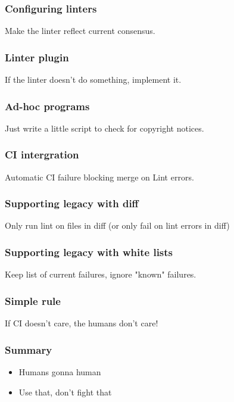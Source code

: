 \begin{frame}
\frametitle{Configuring linters}
Make the linter reflect current consensus.
\end{frame}

\begin{frame}
\frametitle{Linter plugin}
If the linter doesn't do something,
implement it.
\end{frame}

\begin{frame}
\frametitle{Ad-hoc programs}
Just write a little script to check for copyright notices.
\end{frame}

\begin{frame}
\frametitle{CI intergration}
Automatic CI failure blocking merge on Lint errors.
\end{frame}

\begin{frame}
\frametitle{Supporting legacy with diff}
Only run lint on files in diff
(or only fail on lint errors in diff)
\end{frame}

\begin{frame}
\frametitle{Supporting legacy with white lists}
Keep list of current failures,
ignore "known" failures.
\end{frame}

\begin{frame}
\frametitle{Simple rule}
If CI doesn't care,
the humans don't care!
\end{frame}

\begin{frame}
\frametitle{Summary}
\begin{itemize}
\item Humans gonna human
\item Use that, don't fight that
\end{itemize}
\end{frame}


